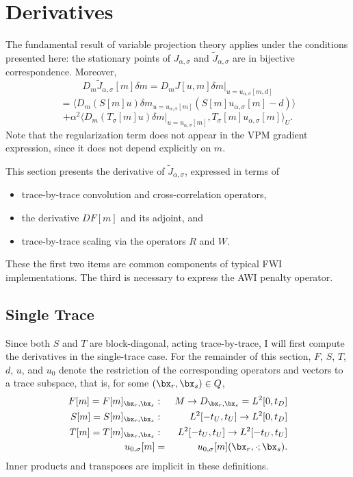 \section{Derivatives}
The fundamental result of variable projection theory
\cite[]{GolubPereyra:73} applies under the conditions presented here:
the stationary points of $J_{\alpha,\sigma}$ and
$\tilde{J}_{\alpha,\sigma}$ are in bijective correspondence. Moreover,
\[
D_m\tilde{J}_{\alpha,\sigma}[m]\delta m = D_mJ[u,m]\delta m|_{u =u_{\alpha,\sigma}[m,d]}
\]
\[
  = \langle D_m(S[m]u)\delta m_{u =  u_{\alpha,\sigma}[m]} (S[m]u_{\alpha,\sigma}[m]-d) \rangle
\]
\begin{equation}
+ \alpha^2 \langle D_m(T_{\sigma}[m]u)\delta m|_{u=u_{\alpha,\sigma}[m]},T_{\sigma}[m]u_{\alpha,\sigma}[m]\rangle_U.
\label{eqn:basederiv}
\end{equation}
Note that the regularization term does not appear in the VPM gradient expression, since it does not depend explicitly on $m$.

This section presents the derivative of $\tilde{J}_{\alpha,\sigma}$, expressed in terms of
\begin{itemize}
  \item trace-by-trace convolution and cross-correlation operators,
  \item the derivative $DF[m]$ and its adjoint, and
  \item trace-by-trace scaling via the operators $R$ and $W$.
\end{itemize}
These the first two items are common components of typical FWI implementations. The
third is necessary to express the AWI penalty operator.

\subsection{Single Trace}

Since both $S$ and $T$ are block-diagonal, acting trace-by-trace, I
will first compute the derivatives in the single-trace case. For the
remainder of this section, $F$, $S$, $T$, $d$, $u$, and $u_0$ denote
the restriction of the corresponding operators and vectors to a trace subspace, that is, for some $(\bx_r,\bx_s) \in Q$,
\begin{eqnarray*}
  F[m] = F[m]_{\bx_r,\bx_s}&: & M \rightarrow D_{\bx_r,\bx_s} =
                 L^2[0,t_D] \\
  S[m] = S[m]_{\bx_r,\bx_s}&: & L^2[-t_U,t_U] \rightarrow L^2[0,t_D] \\
  T[m] = T[m]_{\bx_r,\bx_s}&: & L^2[-t_U,t_U] \rightarrow L^2[-t_U,t_U] \\
  u_{0,\sigma}[m] &=& u_{0,\sigma}[m](\bx_r,\cdot;\bx_s).
\end{eqnarray*}
Inner products and transposes are implicit in these definitions.

